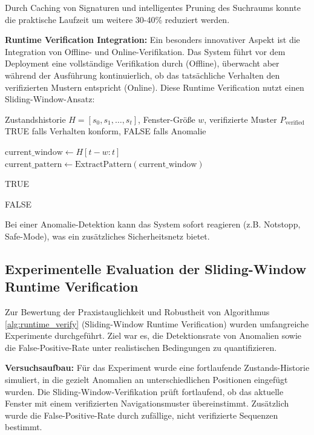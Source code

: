 ﻿\documentclass[a4paper,12pt]{article}
\theoremstyle{definition}
\begin{document}
Durch Caching von Signaturen und intelligentes Pruning des Suchraums konnte die praktische Laufzeit um weitere 30-40\% reduziert werden.

\textbf{Runtime Verification Integration:}
Ein besonders innovativer Aspekt ist die Integration von Offline- und Online-Verifikation. Das System führt vor dem Deployment eine vollständige Verifikation durch (Offline), überwacht aber während der Ausführung kontinuierlich, ob das tatsächliche Verhalten den verifizierten Mustern entspricht (Online). Diese Runtime Verification nutzt einen Sliding-Window-Ansatz:

\begin{algorithm}
	\caption{Runtime Verification mit Sliding Window}
	\label{alg:runtime_verify}
	\begin{algorithmic}[1]
		\Require Zustandshistorie $H = [s_0, s_1, \ldots, s_t]$, Fenster-Größe $w$, verifizierte Muster $P_{\text{verified}}$
		\Ensure TRUE falls Verhalten konform, FALSE falls Anomalie
		
		\State $\text{current\_window} \gets H[t-w:t]$ 
		\State $\text{current\_pattern} \gets \text{ExtractPattern}(\text{current\_window})$
		
		\State \Return TRUE 
		\EndIf
		\EndFor
		
		\State \Return FALSE 
	\end{algorithmic}
\end{algorithm}

Bei einer Anomalie-Detektion kann das System sofort reagieren (z.B. Notstopp, Safe-Mode), was ein zusätzliches Sicherheitsnetz bietet.

\subsection{Experimentelle Evaluation der Sliding-Window Runtime Verification}

Zur Bewertung der Praxistauglichkeit und Robustheit von Algorithmus \ref{alg:runtime_verify} (Sliding-Window Runtime Verification) wurden umfangreiche Experimente durchgeführt. Ziel war es, die Detektionsrate von Anomalien sowie die False-Positive-Rate unter realistischen Bedingungen zu quantifizieren.

\textbf{Versuchsaufbau:}
Für das Experiment wurde eine fortlaufende Zustands-Historie simuliert, in die gezielt Anomalien an unterschiedlichen Positionen eingefügt wurden. Die Sliding-Window-Verifikation prüft fortlaufend, ob das aktuelle Fenster mit einem verifizierten Navigationsmuster übereinstimmt. Zusätzlich wurde die False-Positive-Rate durch zufällige, nicht verifizierte Sequenzen bestimmt.
\end{document}
